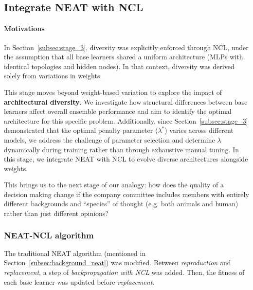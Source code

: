 \subsection{Integrate NEAT with NCL}
\label{subsec:stage_4}


\paragraph{Motivations}
In Section~\ref{subsec:stage_3}, diversity was explicitly enforced through NCL, under the assumption that all base learners shared a uniform architecture (MLPs with identical topologies and hidden nodes). In that context, diversity was derived solely from variations in weights. 

This stage moves beyond weight-based variation to explore the impact of \textbf{architectural diversity}. We investigate how structural differences between base learners affect overall ensemble performance and aim to identify the optimal architecture for this specific problem. Additionally, since Section~\ref{subsec:stage_3} demonstrated that the optimal penalty parameter ($\lambda^*$) varies across different models, we address the challenge of parameter selection and determine $\lambda$ dynamically during training rather than through exhaustive manual tuning. In this stage, we integrate NEAT with NCL to evolve diverse architectures alongside weights. 

This brings us to the next stage of our analogy: how does the quality of a decision making change if the company committee includes members with entirely different backgrounds and ``species'' of thought (e.g. both animals and human) rather than just different opinions? 


\subsubsection{NEAT-NCL algorithm}
The traditional NEAT algorithm (mentioned in Section~\ref{subsec:background_neat}) was modified. Between \textit{reproduction} and \textit{replacement}, a step of \textit{backpropagation with NCL} was added. Then, the fitness of each base learner was updated before \textit{replacement}. 

